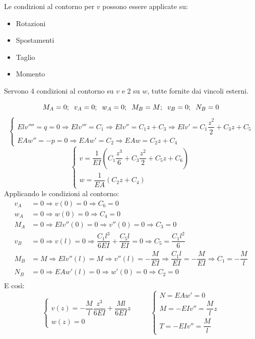 \documentclass{article}
\begin{document}
\begin{adjustwidth}{2in}{}
		Le condizioni al contorno per $ v  $ possono essere
		applicate su:
		\begin{itemize}
			
		\item Rotazioni
		
		\item Spostamenti
		
		\item Taglio
		
		\item Momento
		\end{itemize}
		
		Servono 4 condizioni al contorno su $ v $ e 2 su $ w $, tutte fornite dai vincoli esterni.
		
		\[ M_A = 0; \hspace{0.2cm} v_A = 0; \hspace{0.2cm} w_A = 0; \hspace{0.2cm} M_B = M; \hspace{0.2cm} v_B = 0; \hspace{0.2cm} N_B = 0\]
		\[
		\begin{cases}
			Elv'''' = q = 0 \Rightarrow Elv'''=C_1 \Rightarrow Elv'' = C_1 z + C_3 \Rightarrow Elv'= C_1\dfrac{z^2}{2} + C_3z + C_5 \\
			EAw'' = -p =0 \Rightarrow EAw' =C_2 \Rightarrow EAw = C_2z + C_4
		\end{cases} \]
		\[
		\begin{cases}
			v = \dfrac{1}{EI}\left( C_1\dfrac{z^3}{6} + C_3\dfrac{z^2}{2} + C_5z + C_6 \right) \\
			w = \dfrac{1}{EA} (C_2z + C_4)
		\end{cases}
		\]
		Applicando le condizioni al contorno: 
		\[ \begin{split}
					v_A & = 0 \Rightarrow v(0) = 0 \Rightarrow C_6 = 0 \\
					w_A & = 0 \Rightarrow w(0) = 0 \Rightarrow C_4 = 0 \\
					M_A & = 0 \Rightarrow Elv''(0) = 0 \Rightarrow v''(0) = 0 \Rightarrow C_3 = 0 \\
					v_B & = 0 \Rightarrow v(l) = 0 \Rightarrow \dfrac{C_1l^3}{6EI} + \dfrac{C_5l}{EI} = 0 \Rightarrow C_5 = \dfrac{C_1l^2}{6} \\
					M_B & = M \Rightarrow Elv''(l) = M \Rightarrow v''(l) = -\dfrac{M}{EI} \Rightarrow \dfrac{C_1l}{EI} = -\dfrac{M}{EI} \Rightarrow C_1 = -\dfrac{M}{l} \\
					N_B & = 0 \Rightarrow EAw'(l) = 0 \Rightarrow w'(0) = 0 \Rightarrow C_2 = 0 \\					
		\end{split}
		\]
		E così:
		\[
		\begin{cases}
			v(z) =  -\dfrac{M}{l}\dfrac{z^3}{6EI}  + \dfrac{Ml}{6EI}z  \\
			w(z) = 0
		\end{cases} \hspace{1cm} \begin{cases}
				N = EAw'= 0 \\
				M = -EIv'' = \dfrac{M}{l}z \\
				T = -EIv'' = \dfrac{M}{l}
			\end{cases}
		\]
		

\end{adjustwidth}
\end{document}
